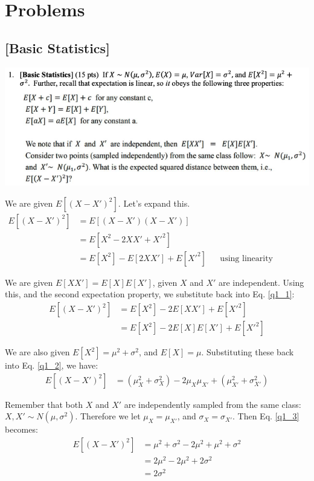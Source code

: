 \section{Problems}

\subsection{[Basic Statistics]}

\includegraphics[width=1\textwidth]{media/hw2_q1.png}

We are given $E[(X-X')^2]$. Let's expand this.
\begin{align}
    E[(X-X')^2] &= E[(X-X')(X-X')] \nonumber \\
    &= E[X^2 - 2XX' + X'^2] \nonumber \\
    &= E[X^2] - E[2XX'] + E[X'^2 ] && \text{using linearity property} \label{q1_1}
\end{align}

We are given $E[XX']=E[X]E[X']$, given $X$ and $X'$ are independent. Using this, and the second expectation property, we substitute back into Eq. \ref{q1_1}:
\begin{align}
    E[(X-X')^2] &= E[X^2] - 2 E[XX'] + E[X'^2 ] \nonumber \\
    &= E[X^2] - 2 E[X]E[X'] + E[X'^2 ] \label{q1_2}
\end{align}

We are also given $E[X^2]=\mu^2 + \sigma^2$, and $E[X]=\mu$. Substituting these back into Eq. \ref{q1_2}, we have:
\begin{align}
    E[(X-X')^2] &= (\mu_X^2 + \sigma_X^2) - 2\mu_X \mu_{X'} + (\mu_{X'}^2 + \sigma_{X'}^2) \label{q1_3}
\end{align}

Remember that both $X$ and $X'$ are independently sampled from the same class: $X, X' \sim N(\mu, \sigma^2)$. Therefore we let $\mu_X = \mu_{X'}$, and $\sigma_X = \sigma_{X'}$. Then Eq. \ref{q1_3} becomes:
\begin{align}
    E[(X-X')^2] &= \mu^2 + \sigma^2 - 2\mu^2 + \mu^2 + \sigma^2 \nonumber \\
    &= 2\mu^2 - 2\mu^2 + 2\sigma^2 \nonumber \\
    &= 2\sigma^2 \label{q1_4}
\end{align}

